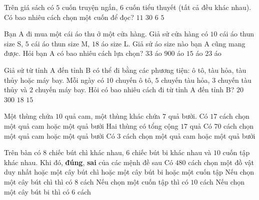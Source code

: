 \begin{ex}%
	Trên giá sách có $5$  cuốn truyện ngắn, $6$ cuốn tiểu thuyết (tất cả đều khác nhau). Có bao nhiêu cách chọn một cuốn để đọc?
	\choice 
		{\True  $11$}
		 {$30$}
		 {$6$}
		 {$5$}
\end{ex}

\begin{ex}%
	Bạn A đi mua một cái áo thu ở một cửa hàng. Giả sử cửa hàng có $10$ cái áo thun size S, $5$ cái áo thun size M, $18$ áo size L.  Giả sử áo size nào bạn A cũng mang được. Hỏi bạn A có bao nhiêu cách lựa chọn?
	\choice 
		 {\True $33$ áo}
		 {$900$ áo}
		 {$15$ áo}
		{$23$ áo} 
\end{ex}

\begin{ex}%
	Giả sử từ tỉnh A đến tỉnh B có thể đi bằng các phương  tiện: ô tô, tàu hỏa, tàu thủy hoặc máy bay.
	Mỗi ngày có $10$ chuyến ô tô, $5$ chuyến tàu hỏa, $3$ chuyến  tàu thủy và $2$ chuyến máy bay. Hỏi có bao nhiêu cách đi từ tỉnh A đến tỉnh B?
	 \choice
		{$20$} 
		{$300$} 
		{\True  $18$}
		 {$15$}
\end{ex}


\begin{ex}%
	Một thùng chứa $10$ quả cam, một thùng khác  chứa $7$ quả bưởi.
	 \choiceTF
		{\True Có  $17$ cách chọn một quả cam hoặc một quả bưởi}
		{\True Hai thùng  có tổng cộng $17$ quả}
		 {Có $70$ cách chọn một quả cam hoặc một quả bưởi}
		{Có $3$ cách chọn một quả cam hoặc một quả  bưởi}
\end{ex}

\begin{ex}%
	Trên bàn có $8$ chiếc bút chì khác nhau, $6$ chiếc bút bi khác nhau và $10$ cuốn tập khác  nhau. Khi đó, \textbf{đúng}, \textbf{sai} của các mệnh đề sau
	\choiceTF 
		{Có $480$ cách chọn một đồ vật duy nhất hoặc một cây bút  chì hoặc một cây bút bi hoặc một cuốn tập}
		{\True Nếu  chọn một cây bút chì thì có $8$ cách}
		{\True Nếu  chọn một cuốn tập thì có $10$ cách}
		{\True Nếu  chọn một cây bút bi thì có $6$ cách}
\end{ex}

